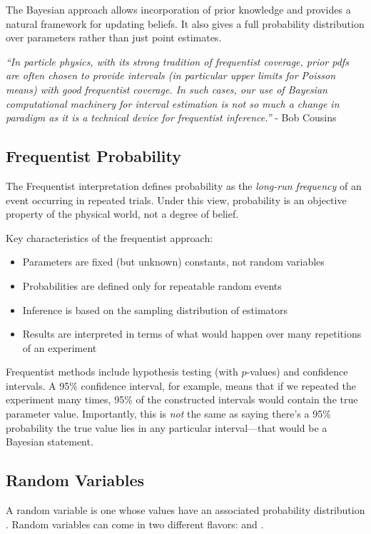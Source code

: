 The Bayesian approach allows incorporation of prior knowledge and provides a natural framework for updating beliefs. It also gives a full probability distribution over parameters rather than just point estimates.

\textit{``In particle physics, with its strong tradition of frequentist coverage, prior pdfs are often chosen to provide intervals (in particular upper limits for Poisson means) with good frequentist coverage. In such cases, our use of Bayesian computational machinery for interval estimation is not so much a change in paradigm as it is a technical device for frequentist inference.''} - Bob Cousins \cite{cousins}

\subsection{Frequentist Probability}
The Frequentist interpretation defines probability as the \emph{long-run frequency} of an event occurring in repeated trials. Under this view, probability is an objective property of the physical world, not a degree of belief.

Key characteristics of the frequentist approach:
\begin{itemize}
	\item Parameters are fixed (but unknown) constants, not random variables
	\item Probabilities are defined only for repeatable random events
	\item Inference is based on the sampling distribution of estimators
	\item Results are interpreted in terms of what would happen over many repetitions of an experiment
\end{itemize}

Frequentist methods include hypothesis testing (with $p$-values) and confidence intervals. A 95\% confidence interval, for example, means that if we repeated the experiment many times, 95\% of the constructed intervals would contain the true parameter value. Importantly, this is \emph{not} the same as saying there's a 95\% probability the true value lies in any particular interval---that would be a Bayesian statement.



\subsection{Random Variables}
A random variable is one whose values have an associated probability distribution \cite{grus}. Random variables can come in two different flavors:  and . 

